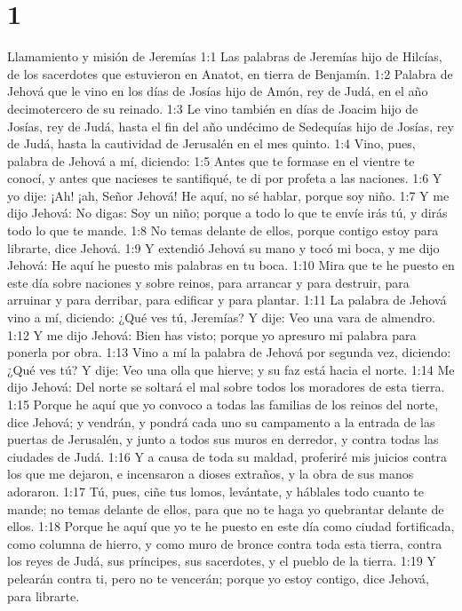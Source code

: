 
\chapter{1}

Llamamiento y misión de Jeremías  1:1 Las palabras de Jeremías hijo de Hilcías, de los sacerdotes que estuvieron en Anatot, en tierra de Benjamín.  
1:2 Palabra de Jehová que le vino en los días de Josías hijo de Amón, rey de Judá, en el año decimotercero de su reinado.  
1:3 Le vino también en días de Joacim hijo de Josías, rey de Judá, hasta el fin del año undécimo de Sedequías hijo de Josías, rey de Judá, hasta la cautividad de Jerusalén en el mes quinto.  
1:4 Vino, pues, palabra de Jehová a mí, diciendo:  
1:5 Antes que te formase en el vientre te conocí, y antes que nacieses te santifiqué, te di por profeta a las naciones.  
1:6 Y yo dije: ¡Ah! ¡ah, Señor Jehová! He aquí, no sé hablar, porque soy niño.  
1:7 Y me dijo Jehová: No digas: Soy un niño; porque a todo lo que te envíe irás tú, y dirás todo lo que te mande.  
1:8 No temas delante de ellos, porque contigo estoy para librarte, dice Jehová.  
1:9 Y extendió Jehová su mano y tocó mi boca, y me dijo Jehová: He aquí he puesto mis palabras en tu boca.  
1:10 Mira que te he puesto en este día sobre naciones y sobre reinos, para arrancar y para destruir, para arruinar y para derribar, para edificar y para plantar.  
1:11 La palabra de Jehová vino a mí, diciendo: ¿Qué ves tú, Jeremías? Y dije: Veo una vara de almendro.  
1:12 Y me dijo Jehová: Bien has visto; porque yo apresuro mi palabra para ponerla por obra.  
1:13 Vino a mí la palabra de Jehová por segunda vez, diciendo: ¿Qué ves tú? Y dije: Veo una olla que hierve; y su faz está hacia el norte.  
1:14 Me dijo Jehová: Del norte se soltará el mal sobre todos los moradores de esta tierra.  
1:15 Porque he aquí que yo convoco a todas las familias de los reinos del norte, dice Jehová; y vendrán, y pondrá cada uno su campamento a la entrada de las puertas de Jerusalén, y junto a todos sus muros en derredor, y contra todas las ciudades de Judá.  
1:16 Y a causa de toda su maldad, proferiré mis juicios contra los que me dejaron, e incensaron a dioses extraños, y la obra de sus manos adoraron.  
1:17 Tú, pues, ciñe tus lomos, levántate, y háblales todo cuanto te mande; no temas delante de ellos, para que no te haga yo quebrantar delante de ellos.  
1:18 Porque he aquí que yo te he puesto en este día como ciudad fortificada, como columna de hierro, y como muro de bronce contra toda esta tierra, contra los reyes de Judá, sus príncipes, sus sacerdotes, y el pueblo de la tierra.  
1:19 Y pelearán contra ti, pero no te vencerán; porque yo estoy contigo, dice Jehová, para librarte.  

